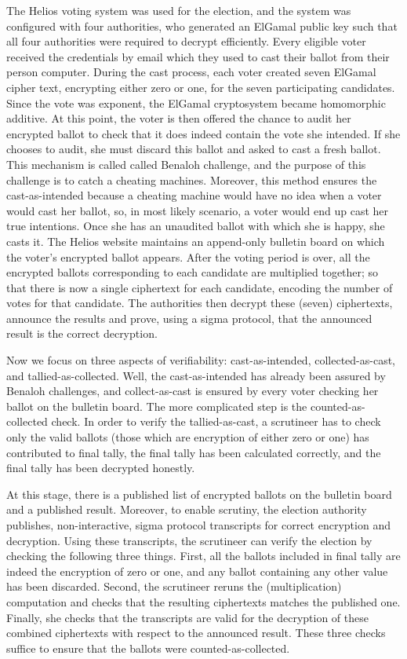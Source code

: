 The Helios voting system \citep{Helios:2016:HVS}  was used for the election, and the system
was configured with four authorities, who generated an ElGamal \citep{elgamal1985public}  public
key such that all four authorities were required to decrypt efficiently.    
Every eligible voter received the credentials by email which they used 
to cast their ballot from their person computer. 
During the cast process, each voter created seven ElGamal cipher text, 
encrypting either zero or one, for the seven participating candidates. 
Since the vote was exponent, the ElGamal cryptosystem became 
homomorphic additive. At this point,  the voter is then offered the chance to audit 
her encrypted ballot to check that
it does indeed contain the vote she intended. If she chooses to audit, she must
discard this ballot and asked to  cast 
a fresh ballot. This mechanism is called called Benaloh challenge, 
and the purpose of this challenge is to catch a cheating machines. 
Moreover, this method ensures the cast-as-intended because 
a cheating machine would have no idea when a voter would 
cast her ballot, so, in most likely scenario, a voter would 
end up cast her true intentions. Once she has an 
unaudited ballot with which she is happy, she casts it. 
The Helios website maintains an append-only bulletin board on which the voter's
encrypted ballot appears.  
After the voting period is over,
all the encrypted ballots corresponding to each candidate are multiplied together; so that there is 
now a single ciphertext for each candidate, encoding the number of votes for
that candidate.  The authorities then decrypt 
these (seven) ciphertexts, announce the results and prove,
using a sigma protocol, that the announced result is the 
correct decryption.


Now we focus on three aspects of verifiability: cast-as-intended, collected-as-cast, 
and tallied-as-collected. Well, the cast-as-intended has already been assured 
by Benaloh challenges, and collect-as-cast is ensured by every voter 
checking her ballot on the bulletin board. 
The more complicated step is the counted-as-collected
check.  In order to verify the tallied-as-cast, a scrutineer has to check 
only the valid ballots (those which are encryption of either zero or one) 
has contributed to final tally, the final tally has been calculated 
correctly, and the final tally has been decrypted honestly. 

At this stage, there is a published list of encrypted ballots on the bulletin board
and a published result.  Moreover, to enable scrutiny, the election authority publishes, 
non-interactive, sigma protocol transcripts for correct encryption and decryption. 
Using these transcripts,  the scrutineer can verify the election by checking the following
three things. First, all the ballots included in final tally are indeed the encryption of 
zero or one, and any ballot containing any other value has been discarded. 
Second, the scrutineer reruns the (multiplication)
computation and checks that the resulting ciphertexts matches the published one.
Finally, she checks that the transcripts are valid for the decryption of these
combined ciphertexts with respect to the announced result.  These  three checks
suffice to ensure that the ballots were counted-as-collected. 



